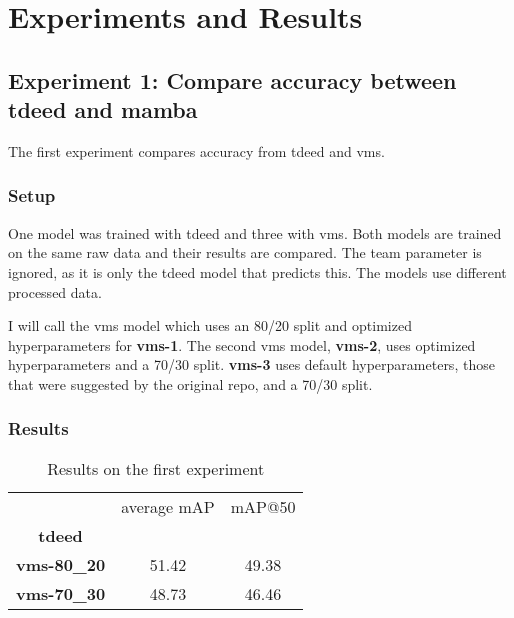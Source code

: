 \chapter{Experiments and Results}
\label{chap:experiments}

\section{Experiment 1: Compare accuracy between tdeed and mamba}

The first experiment compares accuracy from \acrshort{tdeed} and \acrshort{vms}. 

\subsection{Setup}
\label{ssec:ex1_setup}

One model was trained with \acrshort{tdeed} and three with \acrlong{vms}. Both models are trained on the same raw data and their results are compared. The team parameter is ignored, as it is only the \acrshort{tdeed} model that predicts this. The models use different processed data. 

I will call the \acrshort{vms} model which uses an 80/20 split and optimized hyperparameters for \textbf{\acrshort{vms}-1}. The second \acrshort{vms} model, \textbf{\acrshort{vms}-2}, uses optimized hyperparameters and a 70/30 split. \textbf{\acrshort{vms}-3} uses default hyperparameters, those that were suggested by the original repo, and a 70/30 split. 

\subsection{Results}


\begin{table}
    \centering
    \begin{tabular}{ccc}
         & average mAP & mAP@50\\
        \textbf{\acrshort{tdeed}} &  & \\
        \textbf{\acrshort{vms}-80\_20} & 51.42 & 49.38 \\
        \textbf{\acrshort{vms}-70\_30} & 48.73 & 46.46\\
    \end{tabular}
    \caption{Results on the first experiment}
    \label{tab:results_ex1}
\end{table}


